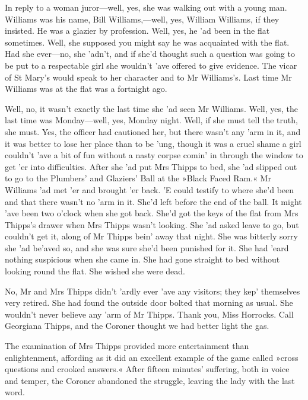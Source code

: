 In reply to a woman juror\allowbreak---\allowbreak well, yes, she was walking out with a young man. Williams was his name, Bill Williams,---well, yes, William Williams, if they insisted. He was a glazier by profession. Well, yes, he 'ad been in the flat sometimes. Well, she supposed you might say he was acquainted with the flat. Had she ever\allowbreak---\allowbreak no, she 'adn't, and if she'd thought such a question was going to be put to a respectable girl she wouldn't 'ave offered to give evidence. The vicar of St Mary's would speak to her character and to Mr Williams's. Last time Mr Williams was at the flat was a fortnight ago.

Well, no, it wasn't exactly the last time she 'ad seen Mr Williams. Well, yes, the last time was Monday\allowbreak---\allowbreak well, yes, Monday night. Well, if she must tell the truth, she must. Yes, the officer had cautioned her, but there wasn't any 'arm in it, and it was better to lose her place than to be 'ung, though it was a cruel shame a girl couldn't 'ave a bit of fun without a nasty corpse comin' in through the window to get 'er into difficulties. After she 'ad put Mrs Thipps to bed, she 'ad slipped out to go to the Plumbers' and Glaziers' Ball at the »Black Faced Ram.« Mr Williams 'ad met 'er and brought 'er back. 'E could testify to where she'd been and that there wasn't no 'arm in it. She'd left before the end of the ball. It might 'ave been two o'clock when she got back. She'd got the keys of the flat from Mrs Thipps's drawer when Mrs Thipps wasn't looking. She 'ad asked leave to go, but couldn't get it, along of Mr Thipps bein' away that night. She was bitterly sorry she 'ad be'aved so, and she was sure she'd been punished for it. She had 'eard nothing suspicious when she came in. She had gone straight to bed without looking round the flat. She wished she were dead.

No, Mr and Mrs Thipps didn't 'ardly ever 'ave any visitors; they kep' themselves very retired. She had found the outside door bolted that morning as usual. She wouldn't never believe any 'arm of Mr Thipps. Thank you, Miss Horrocks. Call Georgiana Thipps, and the Coroner thought we had better light the gas.

The examination of Mrs Thipps provided more entertainment than enlightenment, affording as it did an excellent example of the game called »cross questions and crooked answers.« After fifteen minutes' suffering, both in voice and temper, the Coroner abandoned the struggle, leaving the lady with the last word.

